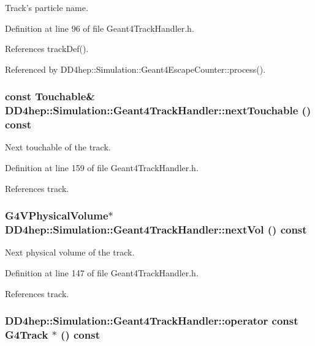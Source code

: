 Track's particle name. 

Definition at line 96 of file Geant4TrackHandler.h.

References trackDef().

Referenced by DD4hep::Simulation::Geant4EscapeCounter::process().\hypertarget{class_d_d4hep_1_1_simulation_1_1_geant4_track_handler_a9d2aba96b778903b66882e922ec24f29}{
\subsubsection[{nextTouchable}]{\setlength{\rightskip}{0pt plus 5cm}const {\bf Touchable}\& DD4hep::Simulation::Geant4TrackHandler::nextTouchable () const}}
\label{class_d_d4hep_1_1_simulation_1_1_geant4_track_handler_a9d2aba96b778903b66882e922ec24f29}


Next touchable of the track. 

Definition at line 159 of file Geant4TrackHandler.h.

References track.\hypertarget{class_d_d4hep_1_1_simulation_1_1_geant4_track_handler_ab1fc24b8386fe9c128724f40ff10eea0}{
\subsubsection[{nextVol}]{\setlength{\rightskip}{0pt plus 5cm}G4VPhysicalVolume$\ast$ DD4hep::Simulation::Geant4TrackHandler::nextVol () const}}
\label{class_d_d4hep_1_1_simulation_1_1_geant4_track_handler_ab1fc24b8386fe9c128724f40ff10eea0}


Next physical volume of the track. 

Definition at line 147 of file Geant4TrackHandler.h.

References track.\hypertarget{class_d_d4hep_1_1_simulation_1_1_geant4_track_handler_a4f2fd4751ba0b7ee7d8339b1b0c7ec04}{
\subsubsection[{operator const G4Track $\ast$}]{\setlength{\rightskip}{0pt plus 5cm}DD4hep::Simulation::Geant4TrackHandler::operator const G4Track $\ast$ () const}}
\label{class_d_d4hep_1_1_simulation_1_1_geant4_track_handler_a4f2fd4751ba0b7ee7d8339b1b0c7ec04}


